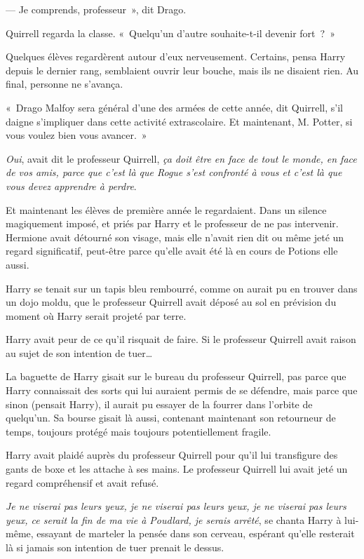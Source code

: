 --- Je comprends, professeur~», dit Drago.

Quirrell regarda la classe.
«~Quelqu'un d'autre souhaite-t-il devenir fort~?~»

Quelques élèves regardèrent autour d'eux nerveusement.
Certains, pensa Harry depuis le dernier rang, semblaient ouvrir leur bouche, mais ils ne disaient rien.
Au final, personne ne s'avança.

«~Drago Malfoy sera général d'une des armées de cette année, dit Quirrell, s'il daigne s'impliquer dans cette activité extrascolaire.
Et maintenant, M. Potter, si vous voulez bien vous avancer.~»

\later

\emph{Oui}, avait dit le professeur Quirrell, \emph{ça doit être en face de tout le monde, en face de vos amis, parce que c'est là que Rogue s'est confronté à vous et c'est là que vous devez apprendre à perdre}.

Et maintenant les élèves de première année le regardaient.
Dans un silence magiquement imposé, et priés par Harry et le professeur de ne pas intervenir.
Hermione avait détourné son visage, mais elle n'avait rien dit ou même jeté un regard significatif, peut-être parce qu'elle avait été là en cours de Potions elle aussi.

Harry se tenait sur un tapis bleu rembourré, comme on aurait pu en trouver dans un dojo moldu, que le professeur Quirrell avait déposé au sol en prévision du moment où Harry serait projeté par terre.

Harry avait peur de ce qu'il risquait de faire.
Si le professeur Quirrell avait raison au sujet de son intention de tuer…

La baguette de Harry gisait sur le bureau du professeur Quirrell, pas parce que Harry connaissait des sorts qui lui auraient permis de se défendre, mais parce que sinon (pensait Harry), il aurait pu essayer de la fourrer dans l'orbite de quelqu'un.
Sa bourse gisait là aussi, contenant maintenant son retourneur de temps, toujours protégé mais toujours potentiellement fragile.

Harry avait plaidé auprès du professeur Quirrell pour qu'il lui transfigure des gants de boxe et les attache à ses mains.
Le professeur Quirrell lui avait jeté un regard compréhensif et avait refusé.

\emph{Je ne viserai pas leurs yeux, je ne viserai pas leurs yeux, je ne viserai pas leurs yeux, ce serait la fin de ma vie à Poudlard, je serais arrêté}, se chanta Harry à lui-même, essayant de marteler la pensée dans son cerveau, espérant qu'elle resterait là si jamais son intention de tuer prenait le dessus.

